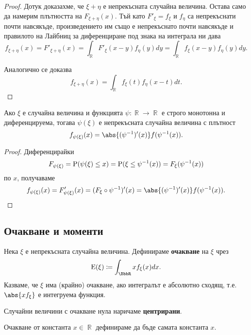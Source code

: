 \documentclass{../../common/topic}
\begin{document}
\begin{proof}
  Дотук доказахме, че \( \xi + \eta \) е непрекъсната случайна величина. Остава само да намерим плътността на \( F_{\xi + \eta}(x) \). Тъй като \( F'_\xi = f_\xi \) и \( f_\eta \) са непрекъснати почти навсякъде, произведението им също е непрекъснато почти навсякъде и правилото на Лайбниц за диференциране под знака на интеграла ни дава
  \begin{equation*}
    f_{\xi + \eta} (x)
    =
    F'_{\xi + \eta} (x)
    =
    \int_{\BbbR} F'_\xi(x - y) f_\eta(y) dy
    =
    \int_{\BbbR} f_\xi(x - y) f_\eta(y) dy.
  \end{equation*}

  Аналогично се доказва
  \begin{equation*}
    f_{\xi + \eta} (x)
    =
    \int_{\BbbR} f_\xi(t) f_\eta(x - t) dt.
  \end{equation*}
\end{proof}

\begin{proposition}\label{thm:density_of_transformed_variable}
  Ако \( \xi \) е случайна величина и функцията \( \psi: \BbbR \to \BbbR \) е строго монотонна и диференцируема, тогава \( \psi(\xi) \) е непрекъсната случайна величина с плътност
  \begin{equation*}
    f_{\psi(\xi)} (x)
    =
    \abs{(\psi^{-1})'(x)} f(\psi^{-1}(x)).
  \end{equation*}
\end{proposition}
\begin{proof} Диференцирайки
  \begin{equation*}
    F_{\psi(\xi)} = \operatorname{P}(\psi(\xi) \leq x) = \operatorname{P}(\xi \leq \psi^{-1}(x)) = F_\xi(\psi^{-1}(x))
  \end{equation*}
  по \( x \), получаваме
  \begin{equation*}
    f_{\psi(\xi)} (x)
    =
    F'_{\psi(\xi)} (x)
    =
    (F_{\xi} \circ \psi^{-1})'(x)
    =
    \abs{(\psi^{-1})'(x)} f(\psi^{-1}(x)).
  \end{equation*}
\end{proof}

\subsection{Очакване и моменти}

\begin{definition}
  Нека \( \xi \) е непрекъсната случайна величина. Дефинираме \textbf{очакване} на \( \xi \) чрез
  \begin{equation*}
    \Expect(\xi) \coloneqq \int_{\BbbR} x f_\xi(x) dx.
  \end{equation*}
  Казваме, че \( \xi \) има (крайно) очакване, ако интегралът е абсолютно сходящ, т.е. \( \abs{x f_\xi} \) е интегруема функция.

  Случайни величини с очакване нула наричаме \textbf{центрирани}.

  Очакване от константа \( x \in \BbbR \) дефинираме да бъде самата константа \( x \).
\end{definition}
\end{document}
